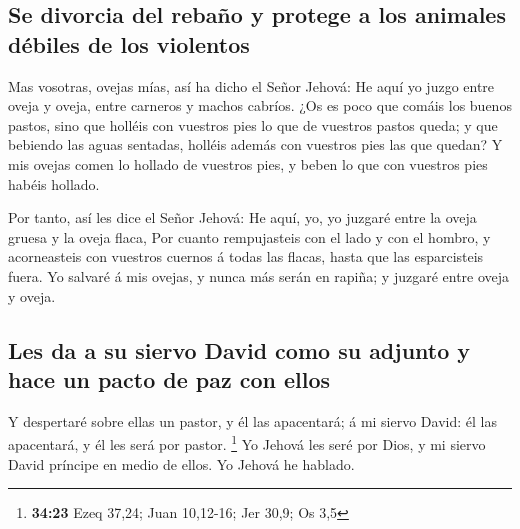 \hypertarget{se-divorcia-del-rebauxf1o-y-protege-a-los-animales-duxe9biles-de-los-violentos}{%
\subsection{Se divorcia del rebaño y protege a los animales débiles de
los
violentos}\label{se-divorcia-del-rebauxf1o-y-protege-a-los-animales-duxe9biles-de-los-violentos}}

 Mas vosotras, ovejas mías, así ha dicho el Señor Jehová:
He aquí yo juzgo entre oveja y oveja, entre carneros y machos cabríos.
 ¿Os es poco que comáis los buenos pastos, sino que
holléis con vuestros pies lo que de vuestros pastos queda; y que
bebiendo las aguas sentadas, holléis además con vuestros pies las que
quedan?  Y mis ovejas comen lo hollado de vuestros pies,
y beben lo que con vuestros pies habéis hollado.

 Por tanto, así les dice el Señor Jehová: He aquí, yo, yo
juzgaré entre la oveja gruesa y la oveja flaca,  Por
cuanto rempujasteis con el lado y con el hombro, y acorneasteis con
vuestros cuernos á todas las flacas, hasta que las esparcisteis fuera.
 Yo salvaré á mis ovejas, y nunca más serán en rapiña; y
juzgaré entre oveja y oveja.

\hypertarget{les-da-a-su-siervo-david-como-su-adjunto-y-hace-un-pacto-de-paz-con-ellos}{%
\subsection{Les da a su siervo David como su adjunto y hace un pacto de
paz con
ellos}\label{les-da-a-su-siervo-david-como-su-adjunto-y-hace-un-pacto-de-paz-con-ellos}}

 Y despertaré sobre ellas un pastor, y él las apacentará;
á mi siervo David: él las apacentará, y él les será por pastor.
\footnote{\textbf{34:23} Ezeq 37,24; Juan 10,12-16; Jer 30,9; Os 3,5}
 Yo Jehová les seré por Dios, y mi siervo David príncipe
en medio de ellos. Yo Jehová he hablado.

